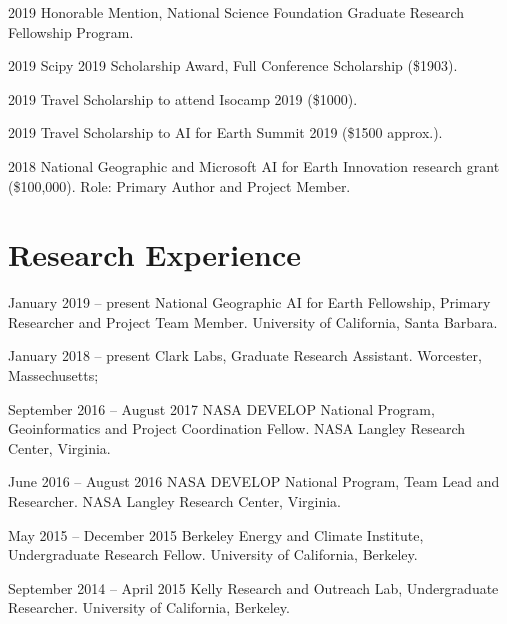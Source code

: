 \documentclass[12pt,letterpaper]{report}
\begin{document}
	\begin{tablist}
		
        \item[2019] \tab Honorable Mention, National Science Foundation Graduate Research Fellowship Program.
        \item[2019] \tab Scipy 2019 Scholarship Award, Full Conference Scholarship (\$1903).
        \item[2019] \tab Travel Scholarship to attend Isocamp 2019 (\$1000).
        \item[2019] \tab Travel Scholarship to AI for Earth Summit 2019 (\$1500 approx.).
		\item[2018] \tab National Geographic and Microsoft AI for Earth Innovation research grant (\$100,000). Role: Primary Author and Project Member.
		
	\end{tablist}
	


    \section*{Research Experience}

    \begin{tablist}

        \item[January 2019 -- present] \tab National Geographic AI for Earth Fellowship, Primary Researcher and Project Team Member. University of California, Santa Barbara.

        \item[January 2018 -- present] \tab Clark Labs, Graduate Research Assistant. Worcester, Massechusetts; 

        \item[September 2016 -- August 2017] \tab NASA DEVELOP National Program, Geoinformatics and Project Coordination Fellow. NASA Langley Research Center, Virginia.

        \item[June 2016 -- August 2016] \tab NASA DEVELOP National Program, Team Lead and Researcher. NASA Langley Research Center, Virginia.

        \item[May 2015 -- December 2015] \tab Berkeley Energy and Climate Institute, Undergraduate Research Fellow. University of California, Berkeley.

        \item[September 2014 -- April 2015] \tab Kelly Research and Outreach Lab, Undergraduate Researcher. University of California, Berkeley.

    \end{tablist}
\end{document}
